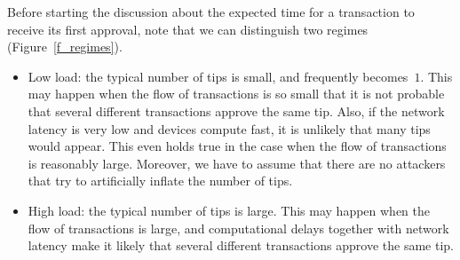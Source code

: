 \documentclass[12pt]{article}
\begin{document}
Before starting the discussion about 
the expected time for a transaction to 
receive its first approval, 
note that
we can distinguish 
two regimes 
(Figure~\ref{f_regimes}).
\begin{itemize}
 \item Low load: the typical number of
tips is small, and frequently becomes~$1$.
This may happen when the flow of transactions is so small
 that it is not probable that several different transactions
approve the same tip. Also, if the network latency is very
low and devices compute fast, it is unlikely
that many tips would appear. This even holds true in the case when the flow
of transactions is reasonably large. Moreover, 
we have to assume that there are no attackers 
that try to artificially inflate the number of tips.
 \item High load: the typical number of tips is large.
This may happen when
the flow of transactions is 
large, and computational delays together with network
latency make it likely that several different transactions
approve the same tip.
\end{itemize}
\end{document}
